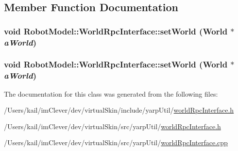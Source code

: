 \subsection{Member Function Documentation}
\hypertarget{class_robot_model_1_1_world_rpc_interface_ae5a8361ea49e3bfb4218d7bcfd791587}{
\subsubsection[{setWorld}]{\setlength{\rightskip}{0pt plus 5cm}void RobotModel::WorldRpcInterface::setWorld ({\bf World} $\ast$ {\em aWorld})}}
\label{class_robot_model_1_1_world_rpc_interface_ae5a8361ea49e3bfb4218d7bcfd791587}
\hypertarget{class_robot_model_1_1_world_rpc_interface_ae5a8361ea49e3bfb4218d7bcfd791587}{
\subsubsection[{setWorld}]{\setlength{\rightskip}{0pt plus 5cm}void RobotModel::WorldRpcInterface::setWorld ({\bf World} $\ast$ {\em aWorld})}}
\label{class_robot_model_1_1_world_rpc_interface_ae5a8361ea49e3bfb4218d7bcfd791587}


The documentation for this class was generated from the following files:\begin{DoxyCompactItemize}
\item 
/Users/kail/imClever/dev/virtualSkin/include/yarpUtil/\hyperlink{include_2yarp_util_2world_rpc_interface_8h}{worldRpcInterface.h}\item 
/Users/kail/imClever/dev/virtualSkin/src/yarpUtil/\hyperlink{src_2yarp_util_2world_rpc_interface_8h}{worldRpcInterface.h}\item 
/Users/kail/imClever/dev/virtualSkin/src/yarpUtil/\hyperlink{world_rpc_interface_8cpp}{worldRpcInterface.cpp}\end{DoxyCompactItemize}

